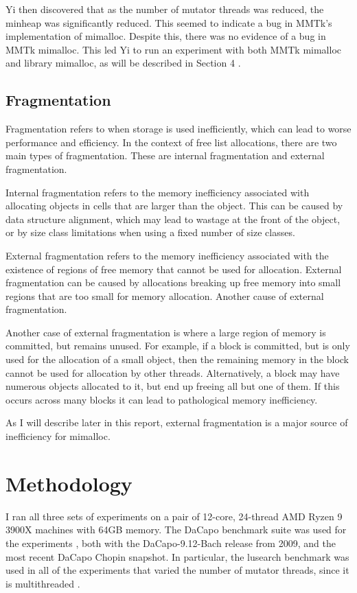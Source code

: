 \documentclass{article}
\begin{document}
Yi then discovered that as the number of mutator threads was reduced, the minheap was significantly reduced. This seemed to indicate a bug in MMTk's implementation of mimalloc. Despite this, there was no evidence of a bug in MMTk mimalloc. This led Yi to run an experiment with both MMTk mimalloc and library mimalloc, as will be described in Section 4 \cite{issue-688}.

\subsection{Fragmentation}
Fragmentation refers to when storage is used inefficiently, which can lead to worse performance and efficiency. In the context of free list allocations, there are two main types of fragmentation. These are internal fragmentation and external fragmentation.

Internal fragmentation refers to the memory inefficiency associated with allocating objects in cells that are larger than the object. This can be caused by data structure alignment, which may lead to wastage at the front of the object, or by size class limitations when using a fixed number of size classes.

External fragmentation refers to the memory inefficiency associated with the existence of regions of free memory that cannot be used for allocation. External fragmentation can be caused by allocations breaking up free memory into small regions that are too small for memory allocation. Another cause of external fragmentation. 

Another case of external fragmentation is where a large region of memory is committed, but remains unused. For example, if a block is committed, but is only used for the allocation of a small object, then the remaining memory in the block cannot be used for allocation by other threads. Alternatively, a block may have numerous objects allocated to it, but end up freeing all but one of them. If this occurs across many blocks it can lead to pathological memory inefficiency.

As I will describe later in this report, external fragmentation is a major source of inefficiency for mimalloc.

\section{Methodology}
I ran all three sets of experiments on a pair of 12-core, 24-thread AMD Ryzen 9 3900X machines with 64GB memory. The DaCapo benchmark suite was used for the experiments \cite{DaCapo:paper}, both with the DaCapo-9.12-Bach release from 2009, and the most recent DaCapo Chopin snapshot. In particular, the lusearch benchmark was used in all of the experiments that varied the number of mutator threads, since it is multithreaded \cite{DaCapo:paper}.
\end{document}
